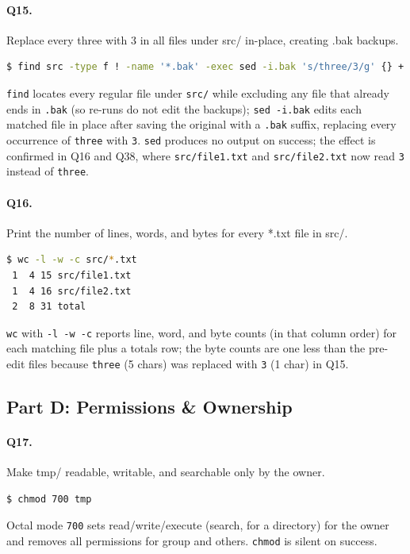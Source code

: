 \paragraph{Q15.} Replace every three with 3 in all files under src/ in-place, creating .bak backups.
\begin{lstlisting}[language=bash,caption={Q15 evidence: \texttt{find src -type f ! -name '*.bak' -exec sed -i.bak 's/three/3/g' \{\} +}},label={Listing:Q15}]
$ find src -type f ! -name '*.bak' -exec sed -i.bak 's/three/3/g' {} +
\end{lstlisting}
\texttt{find} locates every regular file under \texttt{src/} while excluding any file that already ends in \texttt{.bak} (so re-runs do not edit the backups); \texttt{sed -i.bak} edits each matched file in place after saving the original with a \texttt{.bak} suffix, replacing every occurrence of \texttt{three} with \texttt{3}. \texttt{sed} produces no output on success; the effect is confirmed in Q16 and Q38, where \texttt{src/file1.txt} and \texttt{src/file2.txt} now read \texttt{3} instead of \texttt{three}.

\paragraph{Q16.} Print the number of lines, words, and bytes for every *.txt file in src/.
\begin{lstlisting}[language=bash,caption={Q16 evidence: \texttt{wc -l -w -c src/*.txt}},label={Listing:Q16}]
$ wc -l -w -c src/*.txt
 1  4 15 src/file1.txt
 1  4 16 src/file2.txt
 2  8 31 total
\end{lstlisting}
\texttt{wc} with \texttt{-l -w -c} reports line, word, and byte counts (in that column order) for each matching file plus a totals row; the byte counts are one less than the pre-edit files because \texttt{three} (5 chars) was replaced with \texttt{3} (1 char) in Q15.

\subsection{Part D: Permissions \& Ownership}
\paragraph{Q17.} Make tmp/ readable, writable, and searchable only by the owner.
\begin{lstlisting}[language=bash,caption={Q17 evidence: \texttt{chmod 700 tmp}},label={Listing:Q17}]
$ chmod 700 tmp
\end{lstlisting}
Octal mode \texttt{700} sets read/write/execute (search, for a directory) for the owner and removes all permissions for group and others. \texttt{chmod} is silent on success.


